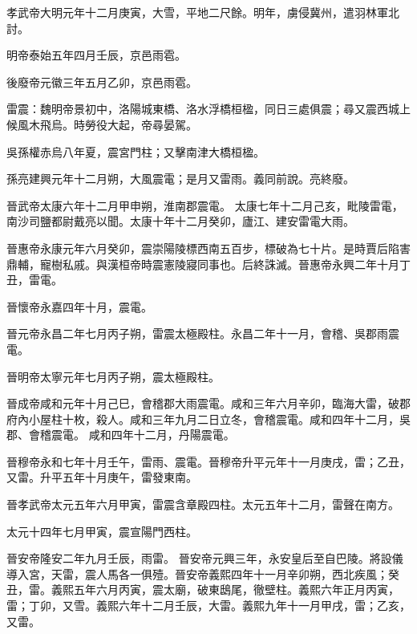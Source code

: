 \begin{pinyinscope}
 孝武帝大明元年十二月庚寅，大雪，平地二尺餘。明年，虜侵冀州，遣羽林軍北討。



 明帝泰始五年四月壬辰，京邑雨雹。



 後廢帝元徽三年五月乙卯，京邑雨雹。



 雷震：魏明帝景初中，洛陽城東橋、洛水浮橋桓楹，同日三處俱震；尋又震西城上候風木飛烏。時勞役大起，帝尋晏駕。



 吳孫權赤烏八年夏，震宮門柱；又擊南津大橋桓楹。



 孫亮建興元年十二月朔，大風震電；是月又雷雨。義同前說。亮終廢。



 晉武帝太康六年十二月甲申朔，淮南郡震電。
 太康七年十二月己亥，毗陵雷電，南沙司鹽都尉戴亮以聞。太康十年十二月癸卯，廬江、建安雷電大雨。



 晉惠帝永康元年六月癸卯，震崇陽陵標西南五百步，標破為七十片。是時賈后陷害鼎輔，寵樹私戚。與漢桓帝時震憲陵寢同事也。后終誅滅。晉惠帝永興二年十月丁丑，雷電。



 晉懷帝永嘉四年十月，震電。



 晉元帝永昌二年七月丙子朔，雷震太極殿柱。永昌二年十一月，會稽、吳郡雨震電。



 晉明帝太寧元年七月丙子朔，震太極殿柱。



 晉成帝咸和元年十月己巳，會稽郡大雨震電。咸和三年六月辛卯，臨海大雷，破郡府內小屋柱十枚，殺人。咸和三年九月二日立冬，會稽震電。咸和四年十二月，吳郡、會稽震電。
 咸和四年十二月，丹陽震電。



 晉穆帝永和七年十月壬午，雷雨、震電。晉穆帝升平元年十一月庚戌，雷；乙丑，又雷。升平五年十月庚午，雷發東南。



 晉孝武帝太元五年六月甲寅，雷震含章殿四柱。太元五年十二月，雷聲在南方。



 太元十四年七月甲寅，震宣陽門西柱。



 晉安帝隆安二年九月壬辰，雨雷。
 晉安帝元興三年，永安皇后至自巴陵。將設儀導入宮，天雷，震人馬各一俱殪。晉安帝義熙四年十一月辛卯朔，西北疾風；癸丑，雷。義熙五年六月丙寅，震太廟，破東鴟尾，徹壁柱。義熙六年正月丙寅，雷；丁卯，又雪。義熙六年十二月壬辰，大雷。義熙九年十一月甲戌，雷；乙亥，又雷。




\end{pinyinscope}
